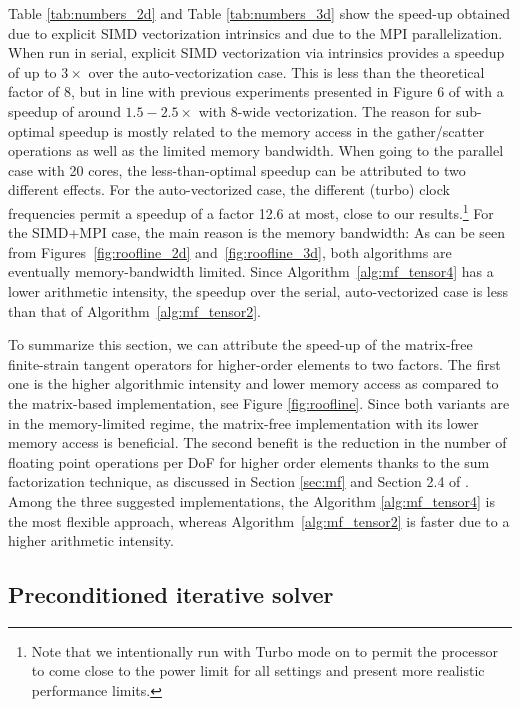 \documentclass[AMA,STIX1COL]{WileyNJD-v2}
\begin{document}
Table \ref{tab:numbers_2d} and Table \ref{tab:numbers_3d} show the speed-up obtained due to explicit SIMD vectorization intrinsics and due to the MPI parallelization.
{\color{red}
When run in serial, explicit SIMD vectorization via intrinsics provides a speedup of up to $3\times$ over the auto-vectorization case. This is less than the theoretical factor of 8, but in line with previous experiments presented in Figure 6 of \cite{kronbichler2017fastcomputer} with a speedup of around $1.5-2.5\times$ with 8-wide vectorization. The reason for sub-optimal speedup is mostly related to the memory access in the gather/scatter operations as well as the limited memory bandwidth. When going to the parallel case with 20 cores, the less-than-optimal speedup can be attributed to two different effects. For the auto-vectorized case, the different (turbo) clock frequencies permit a speedup of a factor 12.6 at most, close to our results.\footnote{Note that we intentionally run with Turbo mode on to permit the processor to come close to the power limit for all settings and present more realistic performance limits.} For the SIMD+MPI case, the main reason is the memory bandwidth: As can be seen from Figures~\ref{fig:roofline_2d} and~\ref{fig:roofline_3d}, both algorithms are eventually memory-bandwidth limited. Since Algorithm~\ref{alg:mf_tensor4} has a lower arithmetic intensity, the speedup over the serial, auto-vectorized case is less than that of Algorithm~\ref{alg:mf_tensor2}.
}

To summarize this section, we can attribute the speed-up of the matrix-free finite-strain tangent operators for higher-order elements to two factors.
{\color{red}
The first one is the higher algorithmic intensity and lower memory access as compared to the matrix-based implementation, see Figure \ref{fig:roofline}. Since both variants are in the memory-limited regime, the matrix-free implementation with its lower memory access is beneficial.
}
The second benefit is the reduction in the number of floating point operations per DoF for higher order elements thanks to the sum factorization technique, as discussed in
Section \ref{sec:mf} and Section 2.4 of \cite{kronbichler12}.
Among the three suggested implementations, the Algorithm \ref{alg:mf_tensor4} is the most flexible approach, whereas Algorithm~\ref{alg:mf_tensor2} is faster due to a higher arithmetic intensity.

\subsection{Preconditioned iterative solver}
\end{document}

